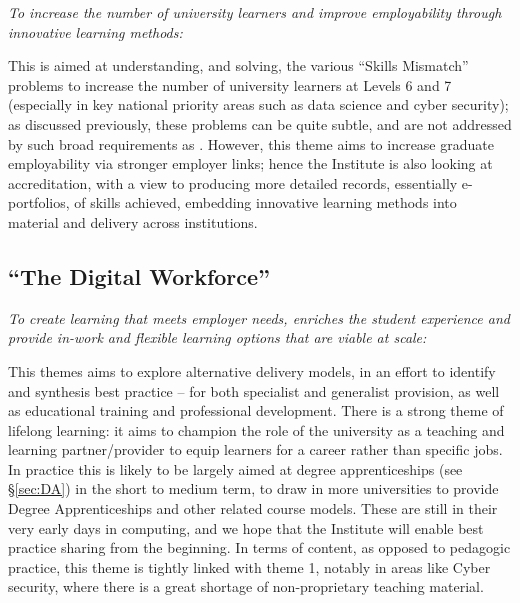 \documentclass[sigconf,anonymous]{acmart}
\begin{document}
{\emph{To increase the number of university learners and improve
employability through innovative learning methods:}}\newline

\noindent This is aimed at understanding, and solving, the various
``Skills Mismatch'' problems to increase the number of university
learners at Levels 6 and 7 (especially in key national priority areas
such as data science and cyber security); as discussed previously,
these problems can be quite subtle, and are not addressed by such
broad requirements as \cite[Requirement 2.3.1]{BCS2018a}. However,
this theme aims to increase graduate employability via stronger
employer links; hence the Institute is also looking at accreditation,
with a view to producing more detailed records, essentially
e-portfolios, of skills achieved, embedding innovative learning
methods into material and delivery across institutions.


\subsection{``The Digital Workforce''}

{\emph{To create learning that meets employer needs, enriches the
student experience and provide in-work and flexible learning options
that are viable at scale:}}\newline

\noindent This themes aims to explore alternative delivery models, in
an effort to identify and synthesis best practice -- for both
specialist and generalist provision, as well as educational training
and professional development. There is a strong theme of lifelong
learning: it aims to champion the role of the university as a teaching
and learning partner/provider to equip learners for a career rather
than specific jobs. In practice this is likely to be largely aimed at
degree apprenticeships (see \S\ref{sec:DA}) in the short to medium
term, to draw in more universities to provide Degree Apprenticeships
and other related course models. These are still in their very early
days in computing, and we hope that the Institute will enable best
practice sharing from the beginning. In terms of content, as opposed
to pedagogic practice, this theme is tightly linked with theme 1,
notably in areas like Cyber security, where there is a great shortage
of non-proprietary teaching material.
\end{document}
